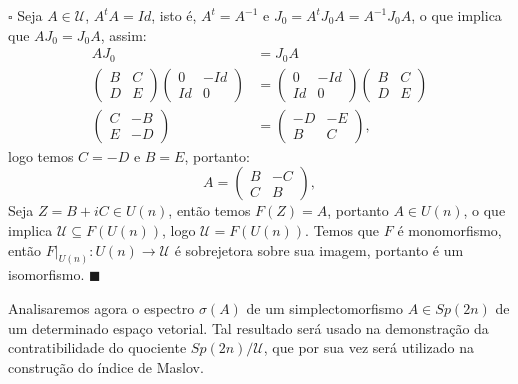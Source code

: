 \documentclass[12pt]{book}
\newenvironment{prova}[1]{$\square$ #1}{\hfill$\blacksquare$}
\newcommand{\espectrooperador}[1]{\sigma(#1)}
\newcommand{\gruposimpletico}[1]{Sp(#1)}
\newcommand{\matrizunitaria}[1]{U(#1)}
\begin{document}
\begin{prova}
		Seja $A \in \mathcal{U}$, $A^{t}A=Id$, isto é, $A^{t}=A^{-1}$ e $J_{0}=A^{t}J_{0}A=A^{-1}J_{0}A$, o que implica que $AJ_{0}=J_{0}A$, assim:
		$$
		\begin{aligned}
			AJ_{0}&=J_{0}A
			\\
			\left(
			\begin{array}{cc}
			B & C
			\\
			D & E
			\end{array}
			\right)
			\left(
			\begin{array}{cc}
			0 & -Id
			\\
			Id & 0
			\end{array}
			\right)
			&=
			\left(
			\begin{array}{cc}
			0 & -Id
			\\
			Id & 0
			\end{array}
			\right)
			\left(
			\begin{array}{cc}
			B & C
			\\
			D & E
			\end{array}
			\right)
			\\
			\left(
			\begin{array}{cc}
			C & -B
			\\
			E & -D
			\end{array}
			\right)
			&=
			\left(
			\begin{array}{cc}
			-D & -E
			\\
			B & C
			\end{array}
			\right), 
		\end{aligned}
		$$
		logo temos $C=-D$ e $B=E$, portanto:
		$$
		A=\left(
		\begin{array}{cc}
		B & -C
		\\
		C & B
		\end{array}
		\right),
		$$
		Seja $Z = B+iC \in \matrizunitaria{n}$, então temos $F(Z) = A$, portanto $A\in \matrizunitaria{n}$, o que implica $\mathcal{U} \subseteq F(\matrizunitaria{n})$, logo $\mathcal{U} = F(\matrizunitaria{n})$. Temos que $F$ é monomorfismo, então $F|_{\matrizunitaria{n}}:\matrizunitaria{n} \to \mathcal{U}$ é sobrejetora sobre sua imagem, portanto é um isomorfismo.
	\end{prova}

	Analisaremos agora o espectro $\espectrooperador{A}$ de um simplectomorfismo $A \in \gruposimpletico{2n}$ de um determinado espaço vetorial. Tal resultado será usado na demonstração da contratibilidade do quociente $\gruposimpletico{2n}/\mathcal{U}$, que por sua vez será utilizado na construção do índice de Maslov.
	
\end{document}

